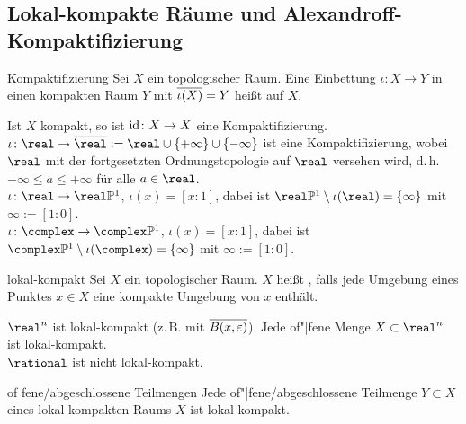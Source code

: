\subsection{%
    Lokal-kompakte Räume und Alexandroff-Kompaktifizierung%
}

\begin{Def}{Kompaktifizierung}
    Sei $X$ ein topologischer Raum.
    Eine Einbettung $\iota\colon X \rightarrow Y$ in einen kompakten
    Raum $Y$ mit $\overline{\iota(X)} = Y$
    heißt  auf $X$.
\end{Def}

\begin{Bsp}
    Ist $X$ kompakt, so ist $\operatorname{id}\colon X \rightarrow X$ eine
    Kompaktifizierung. \\
    $\iota\colon \real \rightarrow \overline{\real} :=
    \real \cup \{+\infty\} \cup \{-\infty\}$ ist eine Kompaktifizierung, wobei
    $\overline{\real}$ mit der fortgesetzten Ordnungstopologie auf $\real$
    versehen wird, d.\,h. $-\infty \le a \le +\infty$ für alle
    $a \in \overline{\real}$. \\
    $\iota\colon \real \rightarrow \real\projective^1$, $\iota(x) = [x:1]$,
    dabei ist $\real\projective^1 \setminus \iota(\real) = \{\infty\}$ mit
    $\infty := [1:0]$. \\
    $\iota\colon \complex \rightarrow \complex\projective^1$,
    $\iota(x) = [x:1]$,
    dabei ist $\complex\projective^1 \setminus \iota(\complex) = \{\infty\}$
    mit $\infty := [1:0]$.
\end{Bsp}

\linie

\begin{Def}{lokal-kompakt}
    Sei $X$ ein topologischer Raum.
    $X$ heißt , falls jede Umgebung eines Punktes
    $x \in X$ eine kompakte Umgebung von $x$ enthält.
\end{Def}

\begin{Bsp}
    $\real^n$ ist lokal-kompakt (z.\,B. mit
    $\overline{B(x, \varepsilon)}$).
    Jede of"|fene Menge $X \subset \real^n$ ist lokal-kompakt. \\
    $\rational$ ist nicht lokal-kompakt.
\end{Bsp}

\begin{Satz}{of \!\!fene/abgeschlossene Teilmengen}
    Jede of"|fene/abgeschlossene Teilmenge $Y \subset X$
    eines lokal-kompakten Raums $X$ ist lokal-kompakt.
\end{Satz}

